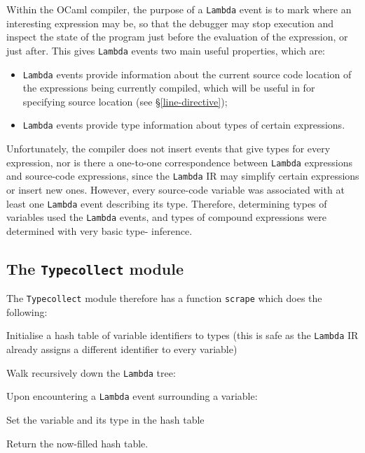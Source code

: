 \documentclass[12pt,a4paper,twoside,openright]{report}
\begin{document}
Within the OCaml compiler, the purpose of a \texttt{Lambda} event is to mark
where an interesting expression may be, so that the debugger may stop execution
and inspect the state of the program just before the evaluation of the
expression, or just after. This gives \texttt{Lambda} events two main useful
properties, which are:

\begin{itemize}

\item \texttt{Lambda} events provide information about the current source code
    location of the expressions being currently compiled, which will be useful
    in for specifying source location (see \S\ref{line-directive});

\item \texttt{Lambda} events provide type information about types of certain
    expressions.

\end{itemize}

Unfortunately, the compiler does not insert events that give types for every
expression, nor is there a one-to-one correspondence between \texttt{Lambda}
expressions and source-code expressions, since the \texttt{Lambda} IR may
simplify certain expressions or insert new ones. However, every source-code
variable was associated with at least one \texttt{Lambda} event describing its
type. Therefore, determining types of variables used the \texttt{Lambda} events,
and types of compound expressions were determined with very basic type-
inference.

\subsection{The \texttt{Typecollect} module}

The \texttt{Typecollect} module therefore has a function \texttt{scrape} which
does the following:

\begin{enumerate}

    \item Initialise a hash table of variable identifiers to types
    (this is safe as the \texttt{Lambda} IR already assigns a different 
    identifier to every variable)

    \item Walk recursively down the \texttt{Lambda} tree:

    {\setlength{\itemindent}{25pt} \item Upon encountering a \texttt{Lambda} 
    event surrounding a variable:}

    {\setlength{\itemindent}{50pt} \item Set the variable and its type in the 
    hash table}

    \item Return the now-filled hash table.

\end{enumerate}
\end{document}
